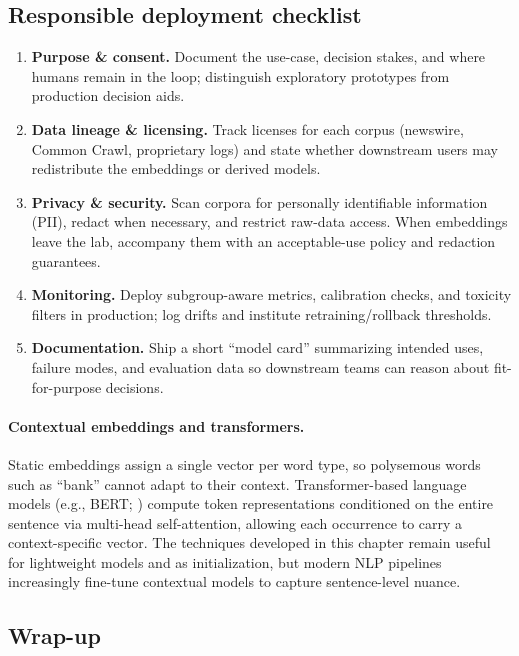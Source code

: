 \subsection{Responsible deployment checklist}
\label{sec:nlp_responsible_deployment_checklist_appendix}
\begin{enumerate}
    \item \textbf{Purpose \& consent.} Document the use-case, decision stakes, and where humans remain in the loop; distinguish exploratory prototypes from production decision aids.
    \item \textbf{Data lineage \& licensing.} Track licenses for each corpus (newswire, Common Crawl, proprietary logs) and state whether downstream users may redistribute the embeddings or derived models.
    \item \textbf{Privacy \& security.} Scan corpora for personally identifiable information (PII), redact when necessary, and restrict raw-data access. When embeddings leave the lab, accompany them with an acceptable-use policy and redaction guarantees.
    \item \textbf{Monitoring.} Deploy subgroup-aware metrics, calibration checks, and toxicity filters in production; log drifts and institute retraining/rollback thresholds.
    \item \textbf{Documentation.} Ship a short ``model card'' summarizing intended uses, failure modes, and evaluation data so downstream teams can reason about fit-for-purpose decisions.
\end{enumerate}

\paragraph{Contextual embeddings and transformers.}\label{sec:nlp_contextual_embeddings_and_transformers}
Static embeddings assign a single vector per word type, so polysemous words such as ``bank'' cannot adapt to their context. Transformer-based language models (e.g., BERT; \citealp{Devlin2019}) compute token representations conditioned on the entire sentence via multi-head self-attention, allowing each occurrence to carry a context-specific vector. The techniques developed in this chapter remain useful for lightweight models and as initialization, but modern NLP pipelines increasingly fine-tune contextual models to capture sentence-level nuance.

\subsection*{Wrap-up}

